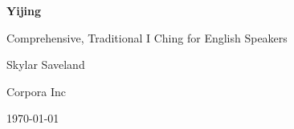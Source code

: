 \begin{titlepage}
    \centering
    \vspace*{1in}
    {\Huge\bfseries Yijing\par}
    {\Large Comprehensive, Traditional I Ching for English Speakers\par}
    \vspace{1in}
    {\Large Skylar Saveland\par}
    {\Large Corpora Inc\par}
    \vfill
    {\large \today\par}
\end{titlepage}
